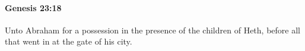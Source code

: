 
		\paragraph{Genesis 23:18} %
			\label{GENESIS-23-18}

			Unto Abraham for a possession in the presence of the children of Heth, before all that went in at the gate of his city.


